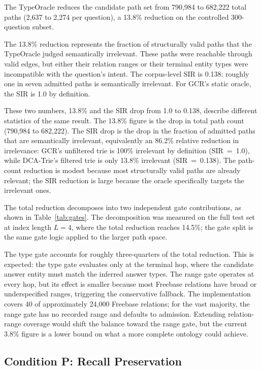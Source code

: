 The TypeOracle reduces the candidate path set from 790,984 to 682,222 total paths (2,637 to 2,274 per question), a 13.8\% reduction on the controlled 300-question subset.

The 13.8\% reduction represents the fraction of structurally valid paths that the TypeOracle judged semantically irrelevant. These paths were reachable through valid edges, but either their relation ranges or their terminal entity types were incompatible with the question's intent. The corpus-level SIR is 0.138: roughly one in seven admitted paths is semantically irrelevant. For GCR's static oracle, the SIR is 1.0 by definition.

These two numbers, 13.8\% and the SIR drop from 1.0 to 0.138, describe different statistics of the same result. The 13.8\% figure is the drop in total path count (790,984 to 682,222). The SIR drop is the drop in the fraction of admitted paths that are semantically irrelevant, equivalently an 86.2\% relative reduction in irrelevance: GCR's unfiltered trie is 100\% irrelevant by definition (SIR~=~1.0), while DCA-Trie's filtered trie is only 13.8\% irrelevant (SIR~=~0.138). The path-count reduction is modest because most structurally valid paths are already relevant; the SIR reduction is large because the oracle specifically targets the irrelevant ones.

The total reduction decomposes into two independent gate contributions, as shown in Table~\ref{tab:gates}. The decomposition was measured on the full test set at index length $L{=}4$, where the total reduction reaches 14.5\%; the gate split is the same gate logic applied to the larger path space.

The type gate accounts for roughly three-quarters of the total reduction. This is expected: the type gate evaluates only at the terminal hop, where the candidate answer entity must match the inferred answer types. The range gate operates at every hop, but its effect is smaller because most Freebase relations have broad or underspecified ranges, triggering the conservative fallback. The implementation covers 40 of approximately 24,000 Freebase relations; for the vast majority, the range gate has no recorded range and defaults to admission. Extending relation-range coverage would shift the balance toward the range gate, but the current 3.8\% figure is a lower bound on what a more complete ontology could achieve.

\subsection{Condition P: Recall Preservation}

